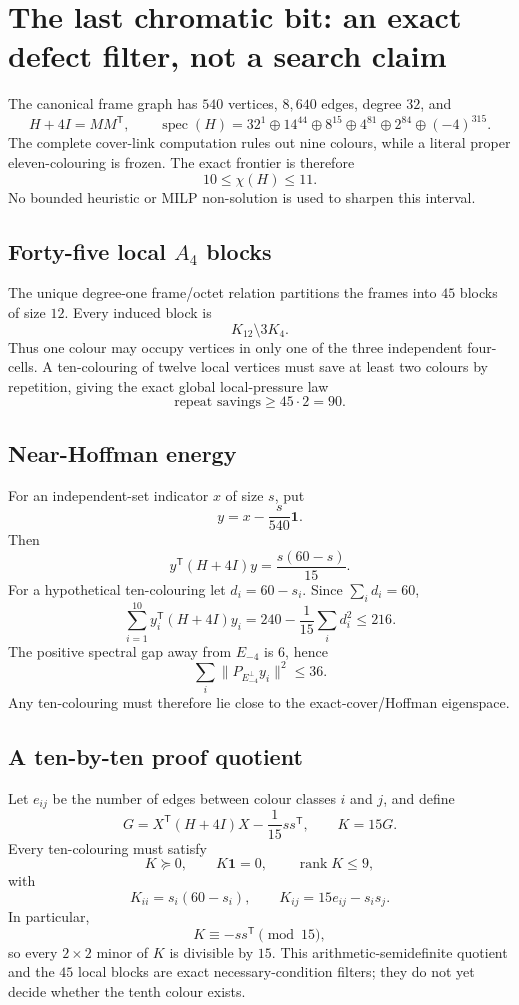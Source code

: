 \section{The last chromatic bit: an exact defect filter, not a search claim}
\label{sec:bt3187-3192-chromatic-defect}

The canonical frame graph has $540$ vertices, $8{,}640$ edges, degree $32$, and
\[
H+4I=MM^{\mathsf T},
\qquad
\operatorname{spec}(H)=32^1\oplus14^{44}\oplus8^{15}\oplus4^{81}\oplus2^{84}\oplus(-4)^{315}.
\]
The complete cover-link computation rules out nine colours, while a literal proper eleven-colouring is frozen.  The exact frontier is therefore
\[
\boxed{10\le\chi(H)\le11.}
\]
No bounded heuristic or MILP non-solution is used to sharpen this interval.

\subsection*{Forty-five local $A_4$ blocks}
The unique degree-one frame/octet relation partitions the frames into $45$ blocks of size $12$.  Every induced block is
\[
\boxed{K_{12}\setminus3K_4.}
\]
Thus one colour may occupy vertices in only one of the three independent four-cells.  A ten-colouring of twelve local vertices must save at least two colours by repetition, giving the exact global local-pressure law
\[
\boxed{\text{repeat savings}\ge45\cdot2=90.}
\]

\subsection*{Near-Hoffman energy}
For an independent-set indicator $x$ of size $s$, put
\[
y=x-\frac{s}{540}\mathbf1.
\]
Then
\[
\boxed{y^{\mathsf T}(H+4I)y=\frac{s(60-s)}{15}.}
\]
For a hypothetical ten-colouring let $d_i=60-s_i$.  Since $\sum_i d_i=60$,
\[
\boxed{
\sum_{i=1}^{10}y_i^{\mathsf T}(H+4I)y_i
=240-\frac1{15}\sum_i d_i^2\le216.
}
\]
The positive spectral gap away from $E_{-4}$ is $6$, hence
\[
\boxed{\sum_i\|P_{E_{-4}^{\perp}}y_i\|^2\le36.}
\]
Any ten-colouring must therefore lie close to the exact-cover/Hoffman eigenspace.

\subsection*{A ten-by-ten proof quotient}
Let $e_{ij}$ be the number of edges between colour classes $i$ and $j$, and define
\[
G=X^{\mathsf T}(H+4I)X-\frac1{15}ss^{\mathsf T},
\qquad K=15G.
\]
Every ten-colouring must satisfy
\[
K\succeq0,
\qquad K\mathbf1=0,
\qquad \operatorname{rank}K\le9,
\]
with
\[
K_{ii}=s_i(60-s_i),
\qquad
K_{ij}=15e_{ij}-s_is_j.
\]
In particular,
\[
\boxed{K\equiv-ss^{\mathsf T}\pmod{15},}
\]
so every $2\times2$ minor of $K$ is divisible by $15$.  This arithmetic-semidefinite quotient and the $45$ local blocks are exact necessary-condition filters; they do not yet decide whether the tenth colour exists.

